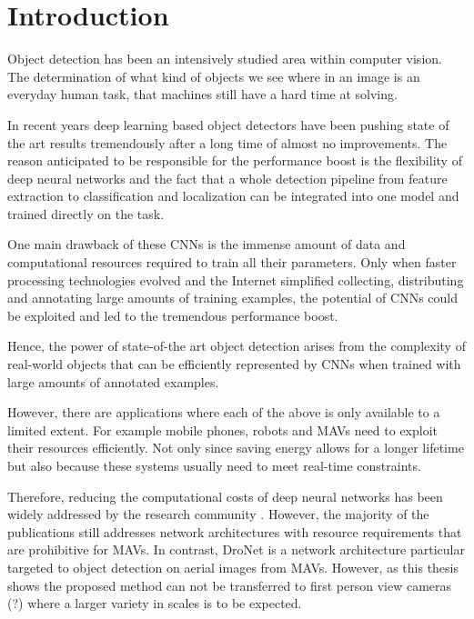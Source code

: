 \chapter{Introduction}
\label{sec:intro}

Object detection has been an intensively studied area within computer vision. The determination of what kind of objects we see where in an image is an everyday human task, that machines still have a hard time at solving.


In recent years deep learning based object detectors have been pushing state of the art results tremendously after a long time of almost no improvements. The reason anticipated to be responsible for the performance boost is the flexibility of deep neural networks and the fact that a whole detection pipeline from feature extraction to classification and localization can be integrated into one model and trained directly on the task.

One main drawback of these \acp{CNN} is the immense amount of data and computational resources required to train all their parameters. Only when faster processing technologies evolved and the Internet simplified collecting, distributing and annotating large amounts of training examples, the potential of \acp{CNN} could be exploited  and led to the tremendous performance boost.

Hence, the power of state-of-the art object detection arises from the complexity of real-world objects that can be efficiently represented by \acp{CNN} when trained with large amounts of annotated examples.

However, there are applications where each of the above is only available to a limited extent. For example mobile phones, robots and \acp{MAV} need to exploit their resources efficiently. Not only since saving energy allows for a longer lifetime but also because these systems usually need to meet real-time constraints.

Therefore, reducing the computational costs of deep neural networks has been widely addressed by the research community . However, the majority of the publications still addresses network architectures with resource requirements that are prohibitive for \acp{MAV}. In contrast, DroNet \cite{Kyrkou2018} is a network architecture particular targeted to object detection on aerial images from \acp{MAV}. However, as this thesis shows the proposed method can not be transferred to first person view cameras (?) where a larger variety in scales is to be expected.

